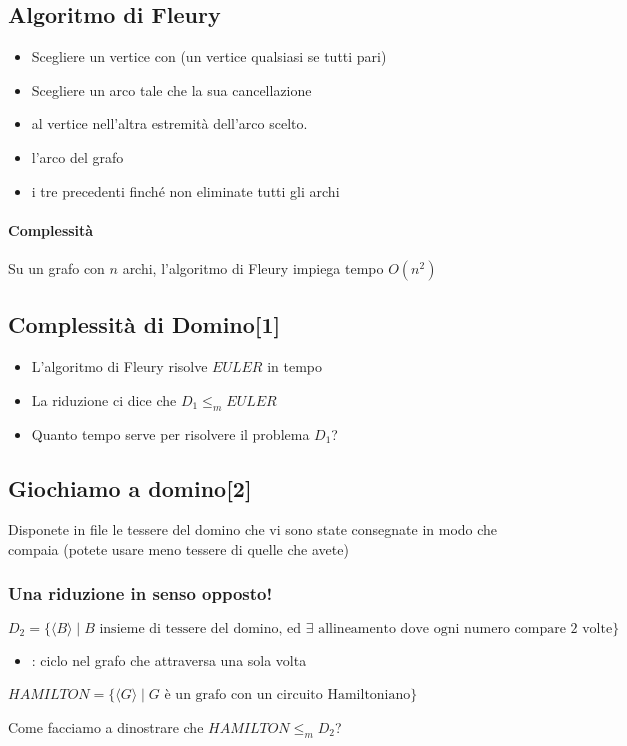 \subsection{Algoritmo di Fleury}
\begin{itemize}
  \item Scegliere un vertice con  
    (un vertice qualsiasi se tutti pari)
  \item Scegliere un arco tale che la sua cancellazione 
  \item {} al vertice nell'altra estremità dell'arco scelto.
  \item {} l'arco del grafo
  \item {} i tre precedenti finché non eliminate tutti gli archi
\end{itemize}
\paragraph{Complessità} Su un grafo con $n$ archi, l'algoritmo di Fleury impiega 
tempo $O(n^2)$ 
\subsection{Complessità di Domino[1]}
\begin{itemize}
  \item L'algoritmo di Fleury risolve $EULER$ in tempo 
  \item La riduzione ci dice che $D_1 \leq_m EULER$ 
  \item Quanto tempo serve per risolvere il problema $D_1$? 
\end{itemize}
\subsection{Giochiamo a domino[2]}
Disponete in file le tessere del domino che vi sono state consegnate in modo che 
 compaia 
(potete usare meno tessere di quelle che avete)
\subsubsection{Una riduzione in senso opposto!}
\[
  D_2 = \{\langle B\rangle\mid B\textrm{ insieme di tessere del domino, ed } \exists 
 \textrm{ allineamento dove ogni numero compare 2 volte}\}
\]
\begin{itemize}
  \item {}: ciclo nel grafo che attraversa 
    una sola volta
\end{itemize}
\begin{definition}
  $HAMILTON =\{\langle G\rangle\mid G\textrm{ è un grafo con un circuito Hamiltoniano}\}$
\end{definition}
Come facciamo a dinostrare che $HAMILTON \leq_m D_2$? 
